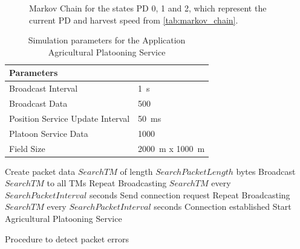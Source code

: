 \begin{figure}[H]
\centering
{}
\caption{Markov Chain for the states \acs{PD} 0, 1 and 2, which represent the current \acf{PD} and harvest speed from \autoref{tab:markov_chain}.}
\label{fig:MarkovChain}
\end{figure}



\begin{table}[H]
	\centering
	\begin{tabular}{p{5cm}p{4cm}}
		\toprule
		Parameters & \\
		\midrule
		Broadcast Interval & \SI{1}{\second}\\
		Broadcast Data & \SI{500}{\byte}\\
		Position Service Update Interval & \SI{50}{\milli\second}\\
		Platoon Service Data & \SI{1000}{\byte}\\
		Field Size & \SI{2000}{\meter} x \SI{1000}{\meter}\\
		\bottomrule
	\end{tabular}
	\caption{Simulation parameters for the Application Agricultural Platooning Service}
	\label{tab:SimulationParameters}
\end{table}


\begin{algorithm}
\begin{algorithmic}[1]
\STATE Create packet data $SearchTM$ of length $SearchPacketLength$ bytes
\STATE Broadcast $SearchTM$ to all \acs{TM}s
    \STATE Repeat Broadcasting $SearchTM$ every $SearchPacketInterval$ seconds
\ELSE
	\STATE Send connection request
		\STATE Repeat Broadcasting $SearchTM$ every $SearchPacketInterval$ seconds
	\ELSE
		\STATE Connection established
		\STATE Start Agricultural Platooning Service
	\ENDIF
\ENDIF
\end{algorithmic}
\caption{Procedure to detect packet errors}
\label{alg:SearchTM}
\end{algorithm}

